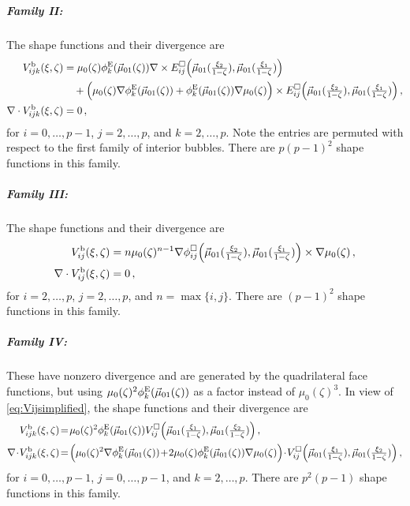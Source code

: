 \subparagraph{Family II:}
The shape functions and their divergence are
\begin{equation}
	\begin{aligned}
		V_{ijk}^{\mathrm{b}}(\xi,\zeta)&=\mu_0(\zeta)\phi_k^{\mathrm{E}}(\vec{\mu}_{01}(\zeta))\nabla\times
			E_{ij}^\square\Big(\vec{\mu}_{01}(\textstyle{\frac{\xi_2}{1-\zeta}}),\vec{\mu}_{01}(\textstyle{\frac{\xi_1}{1-\zeta}})\Big)\\
				&\quad+\Big(\mu_0(\zeta)\nabla\phi_k^{\mathrm{E}}(\vec{\mu}_{01}(\zeta))+\phi_k^{\mathrm{E}}(\vec{\mu}_{01}(\zeta))\nabla\mu_0(\zeta)\Big)
					\times E_{ij}^\square\Big(\vec{\mu}_{01}(\textstyle{\frac{\xi_2}{1-\zeta}}),\vec{\mu}_{01}(\textstyle{\frac{\xi_1}{1-\zeta}})\Big)\,,\\
		\nabla\cdot V_{ijk}^{\mathrm{b}}(\xi,\zeta)&=0\,,
	\end{aligned}
	\label{eq:PyrHdivInteriorII}
\end{equation}
for $i=0,\ldots,p-1$, $j=2,\ldots,p$, and $k=2,\ldots,p$.
Note the entries are permuted with respect to the first family of interior bubbles.
There are $p(p-1)^2$ shape functions in this family.

\subparagraph{Family III:}
The shape functions and their divergence are
\begin{equation}
	\begin{aligned}
		V_{ij}^{\mathrm{b}}(\xi,\zeta)&=n\mu_0(\zeta)^{n-1}
			\nabla\phi_{ij}^\square\Big(\vec{\mu}_{01}(\textstyle{\frac{\xi_2}{1-\zeta}}),\vec{\mu}_{01}(\textstyle{\frac{\xi_1}{1-\zeta}})\Big)\times\nabla\mu_0(\zeta)\,,\\
		\nabla\cdot V_{ij}^{\mathrm{b}}(\xi,\zeta)&=0\,,
	\end{aligned}
	\label{eq:PyrHdivInteriorIII}
\end{equation}
for $i=2,\ldots,p$, $j=2,\ldots,p$, and $n=\max\{i,j\}$.
There are $(p-1)^2$ shape functions in this family.

\subparagraph{Family IV:}
These have nonzero divergence and are generated by the quadrilateral face functions, but using $\mu_0(\zeta)^2\phi_k^{\mathrm{E}}(\vec{\mu}_{01}(\zeta))$ as a factor instead of $\mu_0(\zeta)^3$. 
In view of \eqref{eq:Vijsimplified}, the shape functions and their divergence are
\begin{equation}
	\begin{aligned}
		V_{ijk}^{\mathrm{b}}(\xieta)&\!=\!\mu_0(\zeta)^2\phi_k^\E(\vec{\mu}_{01}(\zeta))
			V_{ij}^\square\Big(\vec{\mu}_{01}(\sxi),\vec{\mu}_{01}(\sxii)\Big)\,,\\
		\nabla\!\cdot\! V_{ijk}^{\mathrm{b}}(\xieta)&\!=\!
				\Big(\mu_0(\zeta)^2\nabla\phi_k^\E(\vec{\mu}_{01}(\zeta))
					\!+\!2\mu_0(\zeta)\phi_k^\E(\vec{\mu}_{01}(\zeta))\nabla\mu_0(\zeta)\Big)
						\!\cdot\! V_{ij}^\square\Big(\vec{\mu}_{01}(\sxi),\vec{\mu}_{01}(\sxii)\Big)\,,
	\end{aligned}
	\label{eq:PyrHdivInteriorIV}
\end{equation}
for $i=0,\ldots,p-1$, $j=0,\ldots,p-1$, and $k=2,\ldots,p$.
There are $p^2(p-1)$ shape functions in this family.

